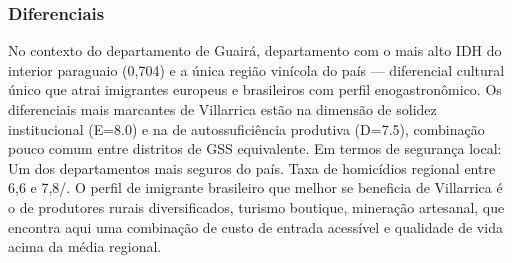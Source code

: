 \subsubsection*{Diferenciais}\label{dif-villarrica-0401}
No contexto do departamento de Guairá, departamento com o mais alto IDH do interior paraguaio (0,704) e a única região vinícola do país — diferencial cultural único que atrai imigrantes europeus e brasileiros com perfil enogastronômico. Os diferenciais mais marcantes de Villarrica estão na dimensão de solidez institucional (E=8.0) e na de autossuficiência produtiva (D=7.5), combinação pouco comum entre distritos de GSS equivalente. Em termos de segurança local: Um dos departamentos mais seguros do país. Taxa de homicídios regional entre 6,6 e 7,8/. O perfil de imigrante brasileiro que melhor se beneficia de Villarrica é o de produtores rurais diversificados, turismo boutique, mineração artesanal, que encontra aqui uma combinação de custo de entrada acessível e qualidade de vida acima da média regional.
